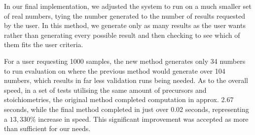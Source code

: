 In our final implementation, we adjusted the system to run on a much smaller set of real numbers, tying the number generated to the number of results requested by the user. In this method, we generate only as many results as the user wants rather than generating every possible result and then checking to see which of them fits the user criteria.

For a user requesting 1000 samples, the new method generates only 34 numbers to run evaluation on where the previous method would generate over 104 numbers, which results in far less validation runs being needed. As to the overall speed, in a set of tests utilising the same amount of precursors and stoichiometries, the original method completed computation in approx. 2.67 seconds, while the final method completed in just over 0.02 seconds, representing a $13,330\%$ increase in speed. This significant improvement was accepted as more than sufficient for our needs.